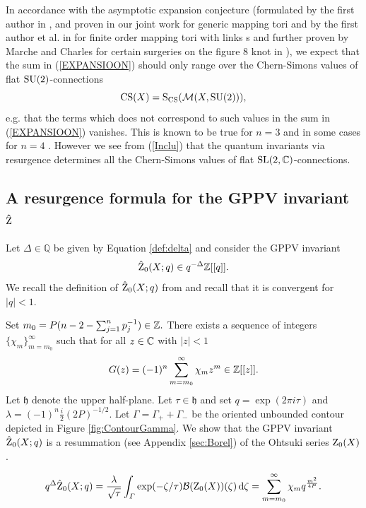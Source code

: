 \begin{remark} In accordance with the asymptotic expansion conjecture (formulated by the first author in \cite{Andersen12Crelle}, and proven in our joint work \cite{AP2} for generic mapping tori and by the first author et al. in \cite{AJHM} for finite order mapping tori with links s and further proven by Marche and Charles for certain surgeries on the figure 8 knot in \cite{CharlesMarchII}), we expect that the sum in (\ref{EXPANSIOON}) should only range over the Chern-Simons values of flat $\operatorname{SU}(2)$-connections 
$$ \operatorname{CS}(X) = \operatorname{S_{CS}}(\mathcal{M}(X,\operatorname{SU}(2))),$$
e.g. that the terms which does not correspond to such values in the sum in (\ref{EXPANSIOON}) vanishes.  
This is known to be true for $n=3$  \cite{Hikami05b} and in some cases for $n=4$ \cite{Hikami05}.
However we see from (\ref{Inclu}) that the quantum invariants via resurgence determines all the Chern-Simons values of flat $\operatorname{SL}(2,\mathbb{C})$-connections.
\end{remark}


\subsection*{A resurgence formula for the GPPV invariant $\mathbf{\hat{\operatorname{Z}}}$ }

Let $\Delta \in \mathbb{Q}$ be given by Equation \eqref{def:delta} and consider the GPPV invariant
\begin{equation}
\hat{\operatorname{Z}}_0(X;q) \in q^{-\Delta} \mathbb{Z}[[q]].
\end{equation} We recall the definition of $\hat{\operatorname{Z}}_0(X;q)$ from \cite{GukovPeiPutrovVada18,GukovCiprian19} and recall that it is convergent for $\lvert q \rvert <1$. 

Set $m_0=P(n-2-\sum_{j=1}^np_j^{-1} ) \in \mathbb{Z}.$ There exists a sequence of integers $\{\chi_m\}_{m=m_0}^{\infty}$ such that for all  $z\in \mathbb{C}$ with $\lvert z \rvert <1$ 
\begin{equation} \label{eq:Gseries}
G(z)=(-1)^n\sum_{m=m_0}^{\infty} \chi_m z^m \in \mathbb{Z}[[z]].
\end{equation} Let $\mathfrak{h}$ denote the upper half-plane. Let $\tau \in \mathfrak{h}$ and set $q=\exp(2\pi i \tau)$ and  $\lambda=(-1)^n \frac{i}{2}(2P)^{-1/2}.$ Let $\varGamma=\varGamma_{+}+\varGamma_{-}$ be the oriented  unbounded contour depicted in Figure \ref{fig:ContourGamma}. We show that the GPPV invariant $\hat{\operatorname{Z}}_0(X;q)$ is a resummation (see Appendix \ref{sec:Borel}) of the Ohtsuki series $\operatorname{Z}_0(X)$.
\begin{theorem} \label{thm:zedhat}  %
	\begin{equation} \label{eq:zedhat}
	q^{\Delta} \hat{\operatorname{Z}}_0(X;q)= \frac{\lambda}{\sqrt{\tau}} \int_{\varGamma} \exp(-\zeta / \tau )  \mathcal{B}(\operatorname{Z}_0(X)) (\zeta) \operatorname{{d}\hskip-.6mm} \zeta =  \sum_{m=m_0}^{\infty} \chi_m q^{\frac{m^2}{4P}}.
	\end{equation}
\end{theorem}

